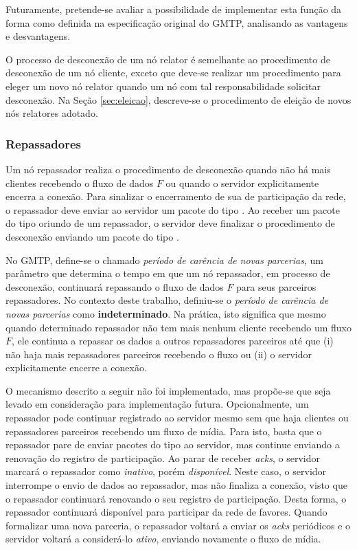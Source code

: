 Futuramente, pretende-se avaliar a possibilidade de implementar esta função da forma como definida na especificação original do GMTP, analisando as vantagens e desvantagens.

O processo de desconexão de um nó relator é semelhante ao procedimento de desconexão de um nó cliente, exceto que deve-se realizar um procedimento para eleger um novo nó relator quando um nó com tal responsabilidade solicitar desconexão. Na Seção \ref{sec:eleicao}, descreve-se o procedimento de eleição de novos nós relatores adotado.

\subsubsection{Repassadores}
Um nó repassador realiza o procedimento de desconexão quando não há mais clientes recebendo o fluxo de dados $F$ ou quando o servidor explicitamente encerra a conexão.
Para sinalizar o encerramento de sua de participação da rede, o repassador deve enviar ao servidor um pacote do tipo . 
Ao receber um pacote do tipo  oriundo de um repassador, o servidor deve finalizar o procedimento de desconexão enviando um pacote do tipo .

No GMTP, define-se o chamado \emph{período de carência de novas parcerias}, um parâmetro que determina o tempo em que um nó repassador, em processo de desconexão, continuará repassando o fluxo de dados $F$ para seus parceiros repassadores.
No contexto deste trabalho, definiu-se o \emph{período de carência de novas parcerias} como \textbf{indeterminado}. Na prática, isto significa que mesmo quando determinado repassador não tem mais nenhum cliente recebendo um fluxo $F$, ele continua a repassar os dados a outros repassadores parceiros até que (i) não haja mais repassadores parceiros recebendo o fluxo ou (ii) o servidor explicitamente encerre a conexão.

O mecanismo descrito a seguir não foi implementado, mas propõe-se que seja levado em consideração para implementação futura.
Opcionalmente, um repassador pode continuar registrado ao servidor mesmo sem que haja clientes ou repassadores parceiros recebendo um fluxo de mídia. Para isto, basta que o repassador pare de enviar pacotes do tipo  ao servidor, mas continue enviando a renovação do registro de participação.
Ao parar de receber \emph{acks}, o servidor marcará o repassador como \textit{inativo}, porém \textit{disponível}. Neste caso, o servidor interrompe o envio de dados ao repassador, mas não finaliza a conexão, visto que o repassador continuará renovando o seu registro de participação.
Desta forma, o repassador continuará disponível para participar da rede de favores. Quando formalizar uma nova parceria, o repassador voltará a enviar os \emph{acks} periódicos e o servidor voltará a considerá-lo \textit{ativo}, enviando novamente o fluxo de mídia.

